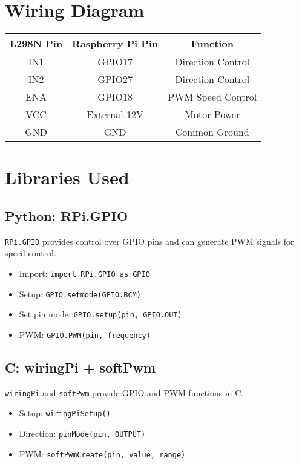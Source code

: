 \documentclass{article}
\begin{document}
	\section{Wiring Diagram}
	\begin{center}
		\begin{tabular}{|c|c|c|}
			\hline
			\textbf{L298N Pin} & \textbf{Raspberry Pi Pin} & \textbf{Function} \\
			\hline
			IN1 & GPIO17 & Direction Control \\
			IN2 & GPIO27 & Direction Control \\
			ENA & GPIO18 & PWM Speed Control \\
			VCC & External 12V & Motor Power \\
			GND & GND & Common Ground \\
			\hline
		\end{tabular}
	\end{center}
	
	\section{Libraries Used}
	\subsection*{Python: RPi.GPIO}
	\texttt{RPi.GPIO} provides control over GPIO pins and can generate PWM signals for speed control.
	
	\begin{itemize}
		\item Import: \texttt{import RPi.GPIO as GPIO}
		\item Setup: \texttt{GPIO.setmode(GPIO.BCM)}
		\item Set pin mode: \texttt{GPIO.setup(pin, GPIO.OUT)}
		\item PWM: \texttt{GPIO.PWM(pin, frequency)}
	\end{itemize}
	
	\subsection*{C: wiringPi + softPwm}
	\texttt{wiringPi} and \texttt{softPwm} provide GPIO and PWM functions in C.
	
	\begin{itemize}
		\item Setup: \texttt{wiringPiSetup()}
		\item Direction: \texttt{pinMode(pin, OUTPUT)}
		\item PWM: \texttt{softPwmCreate(pin, value, range)}
	\end{itemize}
	
\end{document}
